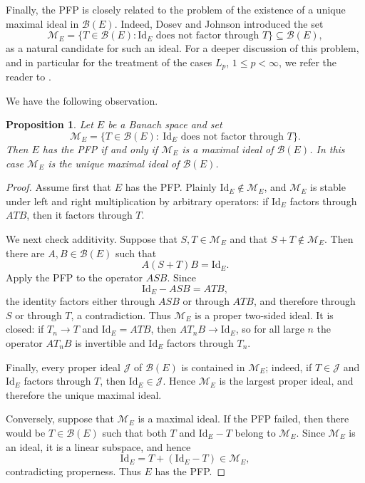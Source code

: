 \documentclass[11pt]{amsart}
\theoremstyle{plain}
\newtheorem{proposition}[theorem]{Proposition}
\theoremstyle{definition}
\numberwithin{equation}{section}
\newcommand{\Bop}{\mathcal{B}}
\newcommand{\Id}{\mathrm{Id}}
\renewcommand{\leq}{\leqslant}
\begin{document}
Finally, the PFP is closely related to the problem of the existence of a unique maximal ideal in $\Bop(E)$. Indeed, Dosev and Johnson \cite{DosevJohnson2010} introduced the set
\begin{equation*}
    \mathcal{M}_E = \{T \in \Bop(E) : \Id_E \text{ does not factor through } T \} \subseteq \Bop(E),
\end{equation*}
as a natural candidate for such an ideal. For a deeper discussion of this problem, and in particular for the treatment of the cases $L_p$, $1 \leq p < \infty$, we refer the reader to \cite{DosevJohnsonSchechtman2013}.

We have the following observation.

\begin{proposition}\label{prop:maximal-ideal-pfp}
Let $E$ be a Banach space and set
\[
    \mathcal M_E=\{T\in\Bop(E):\ \Id_E\text{ does not factor through }T\}.
\]
Then $E$ has the PFP if and only if $\mathcal M_E$ is a maximal ideal of $\Bop(E)$. In this case $\mathcal M_E$ is the unique maximal ideal of $\Bop(E)$.
\end{proposition}

\begin{proof}
    Assume first that $E$ has the PFP. Plainly $\Id_E\notin\mathcal M_E$, and $\mathcal M_E$ is stable under left and right multiplication by arbitrary operators: if $\Id_E$ factors through $ATB$, then it factors through $T$.
    
    We next check additivity. Suppose that $S,T\in\mathcal M_E$ and that $S+T\notin\mathcal M_E$. Then there are $A,B\in\Bop(E)$ such that
    \[
        A(S+T)B=\Id_E.
    \]
    Apply the PFP to the operator $ASB$. Since
    \[
        \Id_E-ASB=ATB,
    \]
    the identity factors either through $ASB$ or through $ATB$, and therefore through $S$ or through $T$, a contradiction. Thus $\mathcal M_E$ is a proper two-sided ideal. It is closed: if $T_n\to T$ and $\Id_E=ATB$, then $AT_nB\to\Id_E$, so for all large $n$ the operator $AT_nB$ is invertible and $\Id_E$ factors through $T_n$.
    
    Finally, every proper ideal $\mathcal J$ of $\Bop(E)$ is contained in $\mathcal M_E$; indeed, if $T\in\mathcal J$ and $\Id_E$ factors through $T$, then $\Id_E\in\mathcal J$. Hence $\mathcal M_E$ is the largest proper ideal, and therefore the unique maximal ideal.
    
    Conversely, suppose that $\mathcal M_E$ is a maximal ideal. If the PFP failed, then there would be $T\in\Bop(E)$ such that both $T$ and $\Id_E-T$ belong to $\mathcal M_E$. Since $\mathcal M_E$ is an ideal, it is a linear subspace, and hence
    \[
        \Id_E=T+(\Id_E-T)\in\mathcal M_E,
    \]
    contradicting properness. Thus $E$ has the PFP.
\end{proof}
\end{document}
